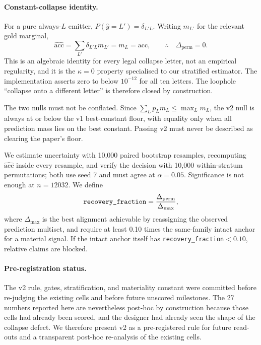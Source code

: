 \paragraph{Constant-collapse identity.}
For a pure always-$L$ emitter, $P(\hat{y}=L')=\delta_{L'L}$. Writing $m_{L'}$ for the relevant gold marginal,
\begin{equation}
\widehat{\mathrm{acc}}
=\sum_{L'}\delta_{L'L}m_{L'}
=m_{L}
=\mathrm{acc},
\qquad
\therefore\quad \Delta_{\mathrm{perm}}=0.
\end{equation}
This is an algebraic identity for every legal collapse letter, not an empirical regularity, and it is the $\kappa=0$ property specialised to our stratified estimator. The implementation asserts zero to below $10^{-12}$ for all ten letters. The loophole ``collapse onto a different letter'' is therefore closed by construction.

The two nulls must not be conflated. Since $\sum_L p_{L}m_{L}\leq\max_Lm_{L}$, the v2 null is always at or below the v1 best-constant floor, with equality only when all prediction mass lies on the best constant. Passing v2 must never be described as clearing the paper's floor.



We estimate uncertainty with 10,000 paired bootstrap resamples, recomputing $\widehat{\mathrm{acc}}$ inside every resample, and verify the decision with 10,000 within-stratum permutations; both use seed 7 and must agree at $\alpha=0.05$. Significance is not enough at $n=12032$. We define
\begin{equation}
\text{\texttt{recovery\_fraction}}=\frac{\Delta_{\mathrm{perm}}}{\Delta_{\max}},
\end{equation}
where $\Delta_{\max}$ is the best alignment achievable by reassigning the observed prediction multiset, and require at least 0.10 times the same-family intact anchor for a material signal. If the intact anchor itself has \texttt{recovery\_fraction}$<0.10$, relative claims are blocked.

\paragraph{Pre-registration status.}
The v2 rule, gates, stratification, and materiality constant were committed before re-judging the existing cells and before future unscored milestones. The 27 numbers reported here are nevertheless post-hoc by construction because those cells had already been scored, and the designer had already seen the shape of the collapse defect. We therefore present v2 as a pre-registered rule for future read-outs and a transparent post-hoc re-analysis of the existing cells.
